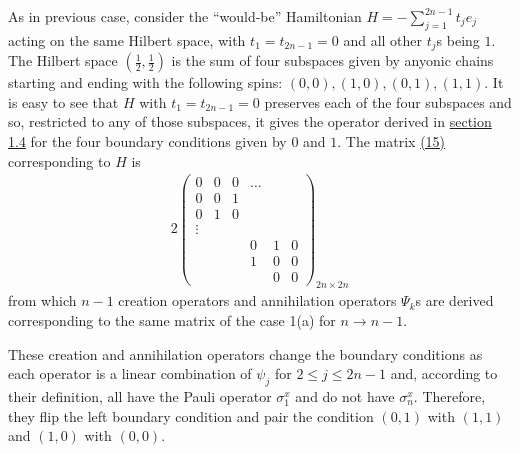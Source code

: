 \documentclass[twoside,11pt,titlepage]{amsart}
\renewcommand{\=}[1]{\stackrel{#1}{=}} %
\theoremstyle{definition}
\theoremstyle{remark}
\begin{document}
As in previous case, consider the ``would-be'' Hamiltonian $H=-\sum_{j=1}^{2n-1} t_je_j$ acting on the same Hilbert space, with $t_1=t_{2n-1}=0$ and all other $t_j$s being $1$. The Hilbert space $(\frac{1}{2},\frac{1}{2})$ is the sum of four subspaces given by anyonic chains starting and ending with the following spins: $(0,0),(1,0),(0,1),(1,1)$. It is easy to see that $H$ with $t_1=t_{2n-1}=0$ preserves each of the four subspaces and so, restricted to any of those subspaces, it gives the operator derived in \hyperref[1.4]{section 1.4} for the four boundary conditions given by $0$ and $1$. The matrix \hyperref[eq15]{(15)} corresponding to $H$ is
\begin{align}\label{eq20}
2\begin{pmatrix}
         0 & 0 & 0 & \ldots &  \\
         0 & 0 & 1 & & & \\
         0 & 1 & 0 & & &  \\
        \vdots & & & & & \\
        & & & 0 & 1 & 0 \\
         & &  & 1 & 0 & 0 \\
         & &  & & 0 & 0 
\end{pmatrix}_{2n \times 2n}
\end{align}
from which $n-1$ creation operators and annihilation operators $\Psi_k$s are derived corresponding to the same matrix of the case 1(a) for $n \rightarrow n-1$. 

These creation and annihilation operators change the boundary conditions as each operator is a linear combination of $\psi_{j}$ for $2 \le j \le 2n-1$ and, according to their definition, all have the Pauli operator $\sigma_1^x$ and do not have $\sigma_{n}^x$. Therefore, they flip the left boundary condition and pair the condition $(0,1)$ with $(1,1)$ and $(1,0)$ with $(0,0)$. 
\end{document}
